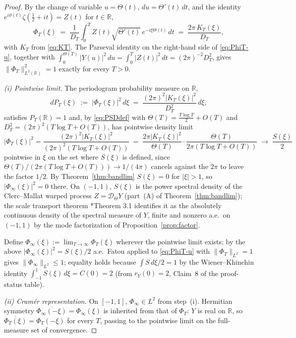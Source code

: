 \documentclass[11pt]{article}
\begin{document}
\begin{proof}
By the change of variable $u=\Theta(t)$, $du=\Theta'(t)\,dt$, and the identity $e^{i\vartheta(t)}\zeta(\tfrac12+it)=Z(t)$ for $t\in\mathbb R$,
\begin{equation}\label{eq:PhiT-u}
\Phi_T(\xi)\;=\;\frac{1}{D_T}\int_{0}^{T}Z(t)\sqrt{\Theta'(t)}\,e^{-i\xi\Theta(t)}\,dt\;=\;\frac{2\pi\,K_T(\xi)}{D_T},
\end{equation}
with $K_T$ from \eqref{eq:KT}. The Parseval identity on the right-hand side of \eqref{eq:PhiT-u}, together with $\int_{0}^{\Theta(T)}|Y(u)|^{2}\,du=\int_{0}^{T}|Z(t)|^{2}\,dt=(2\pi)^{-2}D_T^{2}$, gives $\|\Phi_T\|_{L^{2}(\mathbb R)}^{2}=1$ exactly for every $T>0$.

\emph{(i) Pointwise limit.} The periodogram probability measure on $\mathbb R$,
\begin{equation}\label{eq:PTper}
dP_T(\xi)\;:=\;|\Phi_T(\xi)|^{2}\,d\xi\;=\;\frac{(2\pi)^{2}|K_T(\xi)|^{2}}{D_T^{2}}\,d\xi,
\end{equation}
satisfies $P_T(\mathbb R)=1$ and, by \eqref{eq:PSDdef} with $\Theta(T)=\tfrac{T\log T}{2}+O(T)$ and $D_T^{2}=(2\pi)^{2}(T\log T+O(T))$, has pointwise density limit
\[
|\Phi_T(\xi)|^{2}=\frac{(2\pi)^{2}|K_T(\xi)|^{2}}{(2\pi)^{2}(T\log T+O(T))}\;=\;\frac{2\pi|K_T(\xi)|^{2}}{\Theta(T)}\cdot\frac{\Theta(T)}{2\pi(T\log T+O(T))}\;\longrightarrow\;\frac{S(\xi)}{2}
\]
pointwise in $\xi$ on the set where $S(\xi)$ is defined, since $\Theta(T)/(2\pi(T\log T+O(T)))\to 1/(4\pi)$ cancels against the $2\pi$ to leave the factor $1/2$. By Theorem~\ref{thm:bandlim} $S(\xi)=0$ for $|\xi|>1$, so $|\Phi_\infty(\xi)|^{2}=0$ there. On $(-1,1)$, $S(\xi)$ is the power spectral density of the Clerc--Mallat warped process $Z=\mathcal D_\Theta Y$ (part~(A) of Theorem~\ref{thm:bandlim}); the scale transport theorem \cite{ClercMallat2003}*{Theorem 3.1} identifies it as the absolutely continuous density of the spectral measure of $Y$, finite and nonzero a.e.\ on $(-1,1)$ by the mode factorization of Proposition~\ref{prop:factor}.

Define $\Phi_\infty(\xi):=\lim_{T\to\infty}\Phi_T(\xi)$ wherever the pointwise limit exists; by the above $|\Phi_\infty(\xi)|^{2}=S(\xi)/2$ a.e.\ Fatou applied to \eqref{eq:PhiT-u} with $\|\Phi_T\|_{L^{2}}=1$ gives $\|\Phi_\infty\|_{L^{2}}\le 1$; equality holds because $\int S\,d\xi/2=1$ by the Wiener--Khinchin identity $\int_{-1}^{1}S(\xi)\,d\xi=C(0)=2$ (from $r_Y(0)=2$, Claim~8 of the proof-status table).

\emph{(ii) Cram\'er representation.} On $[-1,1]$, $\Phi_\infty\in L^{2}$ from step~(i). Hermitian symmetry $\overline{\Phi_\infty(-\xi)}=\Phi_\infty(\xi)$ is inherited from that of $\Phi_T$: $Y$ is real on $\mathbb R$, so $\overline{\Phi_T(\xi)}=\Phi_T(-\xi)$ for every $T$, passing to the pointwise limit on the full-measure set of convergence.


\end{proof}
\end{document}
